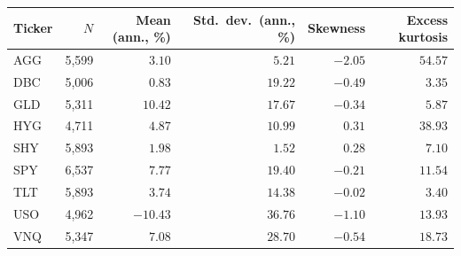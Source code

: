\begin{tabular}{lrrrrr}
\toprule
Ticker & $N$ & Mean (ann., \%) & Std.\ dev.\ (ann., \%) & Skewness & Excess kurtosis \\
\midrule
AGG & 5,599 & $3.10$ & $5.21$ & $-2.05$ & $54.57$ \\
DBC & 5,006 & $0.83$ & $19.22$ & $-0.49$ & $3.35$ \\
GLD & 5,311 & $10.42$ & $17.67$ & $-0.34$ & $5.87$ \\
HYG & 4,711 & $4.87$ & $10.99$ & $0.31$ & $38.93$ \\
SHY & 5,893 & $1.98$ & $1.52$ & $0.28$ & $7.10$ \\
SPY & 6,537 & $7.77$ & $19.40$ & $-0.21$ & $11.54$ \\
TLT & 5,893 & $3.74$ & $14.38$ & $-0.02$ & $3.40$ \\
USO & 4,962 & $-10.43$ & $36.76$ & $-1.10$ & $13.93$ \\
VNQ & 5,347 & $7.08$ & $28.70$ & $-0.54$ & $18.73$ \\
\bottomrule
\end{tabular}

